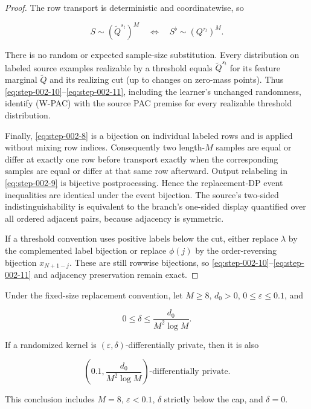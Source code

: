 \begin{proof}
The row transport is deterministic and coordinatewise, so

\[
S\sim(\widetilde Q^{s_t})^M
\quad\Longleftrightarrow\quad
S^{\flat}\sim(Q^{\tau_t})^M.
\tag{S2.11}\label{eq:step-002-11}
\]

There is no random or expected sample-size substitution. Every distribution on labeled source examples realizable by a threshold equals \(\widetilde Q^{s_t}\) for its feature marginal \(\widetilde Q\) and its realizing cut (up to changes on zero-mass points). Thus \eqref{eq:step-002-10}--\eqref{eq:step-002-11}, including the learner's unchanged randomness, identify (W-PAC) with the source PAC premise for every realizable threshold distribution.

Finally, \eqref{eq:step-002-8} is a bijection on individual labeled rows and is applied without mixing row indices. Consequently two length-\(M\) samples are equal or differ at exactly one row before transport exactly when the corresponding samples are equal or differ at that same row afterward. Output relabeling in \eqref{eq:step-002-9} is bijective postprocessing. Hence the replacement-DP event inequalities are identical under the event bijection. The source's two-sided indistinguishability is equivalent to the branch's one-sided display quantified over all ordered adjacent pairs, because adjacency is symmetric.

If a threshold convention uses positive labels below the cut, either replace \(\lambda\) by the complemented label bijection or replace \(\phi(j)\) by the order-reversing bijection \(x_{N+1-j}\). These are still rowwise bijections, so \eqref{eq:step-002-10}--\eqref{eq:step-002-11} and adjacency preservation remain exact. \end{proof}

\begin{lemma}\label{lem:step-002-privacy-monotonicity}
Under the fixed-size replacement convention, let \(M\ge8\), \(d_0>0\),
\(0\le\varepsilon\le0.1\), and

\[
0\le\delta\le\frac{d_0}{M^2\log M}.
\]

If a randomized kernel is \((\varepsilon,\delta)\)-differentially private, then it is also

\[
\left(0.1,\frac{d_0}{M^2\log M}\right)
\text{-differentially private}.
\]

This conclusion includes \(M=8\), \(\varepsilon<0.1\), \(\delta\) strictly below the cap, and \(\delta=0\).
\end{lemma}

